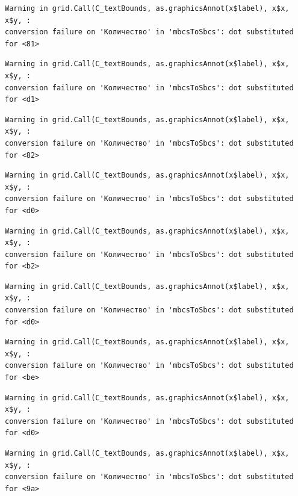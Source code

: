 \documentclass[
  letterpaper,
]{scrbook}
\theoremstyle{definition}
\theoremstyle{remark}
\begin{document}
\begin{verbatim}
Warning in grid.Call(C_textBounds, as.graphicsAnnot(x$label), x$x, x$y, :
conversion failure on 'Количество' in 'mbcsToSbcs': dot substituted for <81>
\end{verbatim}

\begin{verbatim}
Warning in grid.Call(C_textBounds, as.graphicsAnnot(x$label), x$x, x$y, :
conversion failure on 'Количество' in 'mbcsToSbcs': dot substituted for <d1>
\end{verbatim}

\begin{verbatim}
Warning in grid.Call(C_textBounds, as.graphicsAnnot(x$label), x$x, x$y, :
conversion failure on 'Количество' in 'mbcsToSbcs': dot substituted for <82>
\end{verbatim}

\begin{verbatim}
Warning in grid.Call(C_textBounds, as.graphicsAnnot(x$label), x$x, x$y, :
conversion failure on 'Количество' in 'mbcsToSbcs': dot substituted for <d0>
\end{verbatim}

\begin{verbatim}
Warning in grid.Call(C_textBounds, as.graphicsAnnot(x$label), x$x, x$y, :
conversion failure on 'Количество' in 'mbcsToSbcs': dot substituted for <b2>
\end{verbatim}

\begin{verbatim}
Warning in grid.Call(C_textBounds, as.graphicsAnnot(x$label), x$x, x$y, :
conversion failure on 'Количество' in 'mbcsToSbcs': dot substituted for <d0>
\end{verbatim}

\begin{verbatim}
Warning in grid.Call(C_textBounds, as.graphicsAnnot(x$label), x$x, x$y, :
conversion failure on 'Количество' in 'mbcsToSbcs': dot substituted for <be>
\end{verbatim}

\begin{verbatim}
Warning in grid.Call(C_textBounds, as.graphicsAnnot(x$label), x$x, x$y, :
conversion failure on 'Количество' in 'mbcsToSbcs': dot substituted for <d0>
\end{verbatim}

\begin{verbatim}
Warning in grid.Call(C_textBounds, as.graphicsAnnot(x$label), x$x, x$y, :
conversion failure on 'Количество' in 'mbcsToSbcs': dot substituted for <9a>
\end{verbatim}
\end{document}
